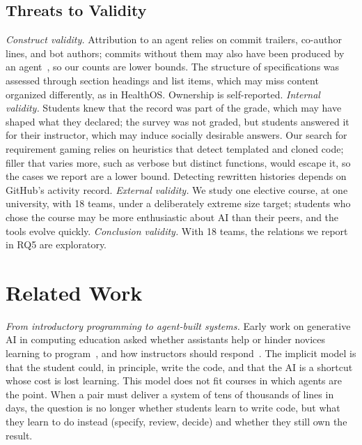 \documentclass[conference]{IEEEtran}
\begin{document}
\subsection{Threats to Validity}

\emph{Construct validity.} Attribution to an agent relies on commit trailers, co-author lines, and bot authors; commits without them may also have been produced by an agent~\cite{kashif2026selfdeclaration}, so our counts are lower bounds. The structure of specifications was assessed through section headings and list items, which may miss content organized differently, as in HealthOS. Ownership is self-reported. \emph{Internal validity.} Students knew that the record was part of the grade, which may have shaped what they declared; the survey was not graded, but students answered it for their instructor, which may induce socially desirable answers. Our search for requirement gaming relies on heuristics that detect templated and cloned code; filler that varies more, such as verbose but distinct functions, would escape it, so the cases we report are a lower bound. Detecting rewritten histories depends on GitHub's activity record. \emph{External validity.} We study one elective course, at one university, with 18 teams, under a deliberately extreme size target; students who chose the course may be more enthusiastic about AI than their peers, and the tools evolve quickly. \emph{Conclusion validity.} With 18 teams, the relations we report in RQ5 are exploratory.

\section{Related Work}

\emph{From introductory programming to agent-built systems.} Early work on generative AI in computing education asked whether assistants help or hinder novices learning to program~\cite{kazemitabaar2023,prather2024widening}, and how instructors should respond~\cite{lau2023ban,prather2023,denny2024}. The implicit model is that the student could, in principle, write the code, and that the AI is a shortcut whose cost is lost learning. This model does not fit courses in which agents are the point. When a pair must deliver a system of tens of thousands of lines in days, the question is no longer whether students learn to write code, but what they learn to do instead (specify, review, decide) and whether they still own the result.
\end{document}
